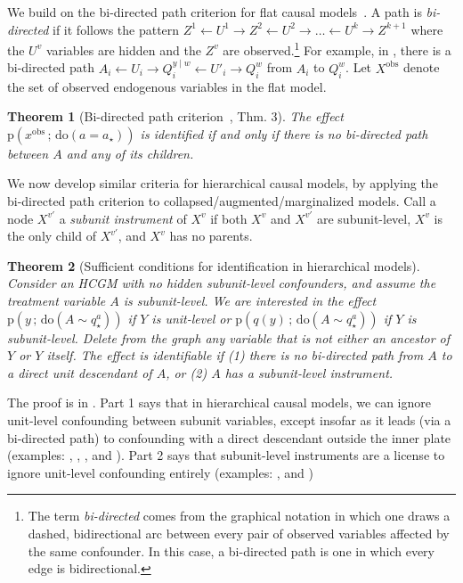 \documentclass[12pt]{article}
\newtheorem{theorem}{Theorem}
\newcommand{\rmdo}{\mathrm{do}}
\newcommand{\s}{\, ; \,}
\newcommand{\pr}{\mathrm{p}}
\newcommand{\obs}{\mathrm{obs}}
\begin{document}
We build on the bi-directed path criterion for flat causal models~\citep[Chap. 3]{Tian2002-xr,Pearl2009-fh}.
A path is \textit{bi-directed} if it follows the pattern $Z^1 \gets U^1 \to Z^2 \gets U^2 \to \ldots \gets U^k \to Z^{k+1}$ where the $U^v$ variables are hidden and the $Z^v$ are observed.\footnote{The term \textit{bi-directed} comes from the graphical notation in which one draws a dashed, bidirectional arc between every pair of observed variables affected by the same confounder. In this case, a bi-directed path is one in which every edge is bidirectional.}
For example, in , there is a bi-directed path $A_i \gets U_i \to Q_i^{y \mid w} \gets U'_i \to Q_i^{w}$ from $A_i$ to $Q_i^{w}$.
Let $X^\obs$ denote the set of observed endogenous variables in the flat model.
\begin{theorem}[Bi-directed path criterion~\citep{Tian2002-xr}, Thm. 3] \label{thm:bidirected}
The effect $\pr(x^{\obs} \s \rmdo(a =a_\star))$ is identified if and only if there is no bi-directed path between $A$ and any of its children.
\end{theorem}




We now develop similar criteria for hierarchical causal models, by applying the bi-directed path criterion to collapsed/augmented/marginalized models.
Call a node $X^{v'}$ a \textit{subunit instrument} of $X^v$ if both $X^v$ and $X^{v'}$ are subunit-level, $X^v$ is the only child of $X^{v'}$, and $X^v$ has no parents.
\begin{theorem}[Sufficient conditions for identification in hierarchical models] \label{thm:sufficient_ID}
        Consider an HCGM with no hidden subunit-level confounders, and assume the treatment variable $A$ is subunit-level.
        We are interested in the effect $\pr(y \s \rmdo(A \sim q^a_\star))$ if $Y$ is unit-level or $\pr(q(y) \s \rmdo(A \sim q^a_\star))$ if $Y$ is subunit-level.
        Delete from the graph any variable that is not either an ancestor of $Y$ or $Y$ itself.
        The effect is identifiable if (1) there is no bi-directed path from $A$ to a direct unit descendant of $A$, or (2) $A$ has a subunit-level instrument.
\end{theorem}
\noindent The proof is in . 
Part 1 says that in hierarchical causal models, we can ignore unit-level confounding between subunit variables, except insofar as it leads (via a bi-directed path) to confounding with a direct descendant outside the inner plate 
(examples: , , ,  and ).
Part 2 says that subunit-level instruments are a license to ignore unit-level confounding entirely 
(examples: ,  and )
\end{document}
